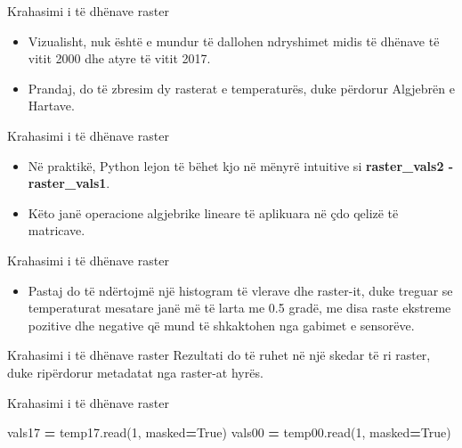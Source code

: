 \documentclass[
  ignorenonframetext,
]{beamer}
\newenvironment{Shaded}{\begin{snugshade}}{\end{snugshade}}
\newcommand{\DecValTok}[1]{\textcolor[rgb]{0.00,0.00,0.81}{#1}}
\newcommand{\NormalTok}[1]{#1}
\newcommand{\OperatorTok}[1]{\textcolor[rgb]{0.81,0.36,0.00}{\textbf{#1}}}
\newcommand{\VariableTok}[1]{\textcolor[rgb]{0.00,0.00,0.00}{#1}}
\providecommand{\tightlist}{%
  \setlength{\itemsep}{0pt}\setlength{\parskip}{0pt}}
\begin{document}
\begin{frame}{Krahasimi i të dhënave raster}
\protect\hypertarget{krahasimi-i-tuxeb-dhuxebnave-raster}{}
\begin{itemize}
\item
  Vizualisht, nuk është e mundur të dallohen ndryshimet midis të dhënave
  të vitit 2000 dhe atyre të vitit 2017.
\item
  Prandaj, do të zbresim dy rasterat e temperaturës, duke përdorur
  Algjebrën e Hartave.
\end{itemize}
\end{frame}

\begin{frame}{Krahasimi i të dhënave raster}
\protect\hypertarget{krahasimi-i-tuxeb-dhuxebnave-raster-1}{}
\begin{itemize}
\item
  Në praktikë, Python lejon të bëhet kjo në mënyrë intuitive si
  \textbf{raster\_vals2 - raster\_vals1}.
\item
  Këto janë operacione algjebrike lineare të aplikuara në çdo qelizë të
  matricave.
\end{itemize}
\end{frame}

\begin{frame}{Krahasimi i të dhënave raster}
\protect\hypertarget{krahasimi-i-tuxeb-dhuxebnave-raster-2}{}
\begin{itemize}
\tightlist
\item
  Pastaj do të ndërtojmë një histogram të vlerave dhe raster-it, duke
  treguar se temperaturat mesatare janë më të larta me 0.5 gradë, me
  disa raste ekstreme pozitive dhe negative që mund të shkaktohen nga
  gabimet e sensorëve.
\end{itemize}
\end{frame}

\begin{frame}{Krahasimi i të dhënave raster}
\protect\hypertarget{krahasimi-i-tuxeb-dhuxebnave-raster-3}{}
Rezultati do të ruhet në një skedar të ri raster, duke ripërdorur
metadatat nga raster-at hyrës.
\end{frame}

\begin{frame}[fragile]{Krahasimi i të dhënave raster}
\protect\hypertarget{krahasimi-i-tuxeb-dhuxebnave-raster-4}{}

\begin{Shaded}
\begin{Highlighting}[]
\NormalTok{vals17 }\OperatorTok{=}\NormalTok{ temp17.read(}\DecValTok{1}\NormalTok{, masked}\OperatorTok{=}\VariableTok{True}\NormalTok{)}
\NormalTok{vals00 }\OperatorTok{=}\NormalTok{ temp00.read(}\DecValTok{1}\NormalTok{, masked}\OperatorTok{=}\VariableTok{True}\NormalTok{)}
\end{Highlighting}
\end{Shaded}
\end{frame}
\end{document}
